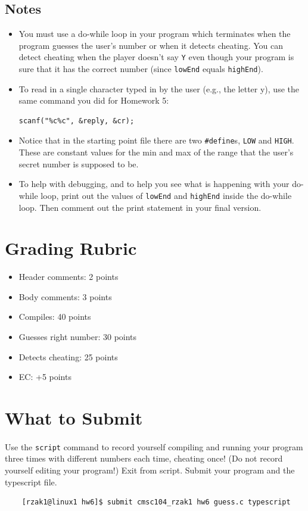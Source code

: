 \documentclass[letter,11pt]{article}
\begin{document}
\subsection*{Notes}
\begin{itemize}
    \item You must use a do-while loop in your program which terminates when the program guesses the user's number or when it detects cheating. You can detect cheating when the player doesn’t say \texttt{Y} even though your program is sure that it has the correct number (since \texttt{lowEnd} equals \texttt{highEnd}).
    \item To read in a single character typed in by the user (e.g., the letter y), use the same command you did for Homework 5:
    \begin{verbatim}
scanf("%c%c", &reply, &cr);
\end{verbatim}
    \item Notice that in the starting point file there are two \verb|#define|s, \texttt{LOW} and \texttt{HIGH}. These are constant values for the min and max of the range that the user’s secret number is supposed to be.
    \item To help with debugging, and to help you see what is happening with your do-while loop, print out the values of \texttt{lowEnd} and \texttt{highEnd} inside the do-while loop. Then comment out the print statement in your final version. 
\end{itemize}

\section*{Grading Rubric}
\begin{itemize}
    \item Header comments: 2 points
    \item Body comments: 3 points
    \item Compiles: 40 points
    \item Guesses right number: 30 points
    \item Detects cheating: 25 points
    \item EC: +5 points
\end{itemize}

\section*{What to Submit}
\paragraph{}Use the \texttt{script} command to record yourself compiling and running your program three times with different numbers each time, cheating once! (Do not record yourself editing your program!) Exit from script. Submit your program and the typescript file.
\begin{verbatim}
    [rzak1@linux1 hw6]$ submit cmsc104_rzak1 hw6 guess.c typescript
\end{verbatim}
\end{document}
